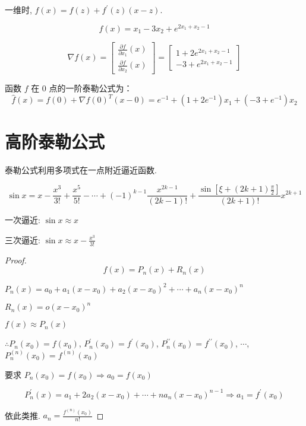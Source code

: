 一维时, $ \hat{f}(x)=f(z)+f^{\prime}(z)(x-z) $.

\begin{example}
    $$ f(x)=x_{1}-3 x_{2}+e^{2 x_{1}+x_{2}-1} $$

    $$ \nabla f(x)=\left[\begin{array}{l}\frac{\partial f}{\partial x_{1}}(x) \\ \frac{\partial f}{\partial x_{2}}(x)\end{array}\right]=\left[\begin{array}{l}1+2 e^{2 x_{1}+x_{2}-1} \\ -3+e^{2 x_{1}+x_{2}-1}\end{array}\right] $$

    函数 $ f $ 在 0 点的一阶泰勒公式为：
    $$ \hat{f}(x)=f(0)+\nabla f(0)^{T}(x-0)=e^{-1}+\left(1+2 e^{-1}\right) x_{1}+\left(-3+e^{-1}\right) x_{2} $$
\end{example}

\section{高阶泰勒公式}

    泰勒公式利用多项式在一点附近逼近函数.
    
\begin{example}
    $$ \sin x= x-\frac{x^{3}}{3 !}+\frac{x^{5}}{5 !}-\cdots+(-1)^{k-1} \frac{x^{2 k-1}}{(2 k-1) !}+\frac{\sin \left[\xi+(2 k+1) \frac{\pi}{2}\right]}{(2 k+1) !} x^{2 k+1} $$

    一次逼近: $  \sin x \approx x $

    三次逼近: $  \sin x \approx x-\frac{x^{3}}{3 !} $
\end{example}

\begin{proof}
    $$ f(x)=P_{n}(x)+R_{n}(x) $$
    
    $ P_{n}(x)=a_{0}+a_{1}\left(x-x_{0}\right)+a_{2}\left(x-x_{0}\right)^{2}+\cdots+a_{n}\left(x-x_{0}\right)^{n}  $

    $ R_{n}(x)=o\left(x-x_{0}\right)^{n} $

    $ f(x) \approx P_{n}(x) $

    $\therefore  P_{n}\left(x_{0}\right)=f\left(x_{0}\right) $,
    $ P_{n}^{\prime}\left(x_{0}\right)=f^{\prime}\left(x_{0}\right) $,
    $ P_{n}^{\prime \prime}\left(x_{0}\right)=f^{\prime \prime}\left(x_{0}\right) $,
    $ \cdots  $,
    $ P_{n}^{(n)}\left(x_{0}\right)=f^{(n)}\left(x_{0}\right) $

    要求 $ P_{n}\left(x_{0}\right)=f\left(x_{0}\right) \Rightarrow  a_{0}=f\left(x_{0}\right)  $

    $$ P_{n}^{\prime}(x)=a_{1}+2 a_{2}\left(x-x_{0}\right)+\cdots+n a_{n}\left(x-x_{0}\right)^{n-1} \Rightarrow  a_{1}=f^{\prime}\left(x_{0}\right)  $$

    依此类推. $a_{n}=\frac{f^{(n)}\left(x_{0}\right)}{n !} $
\end{proof}

